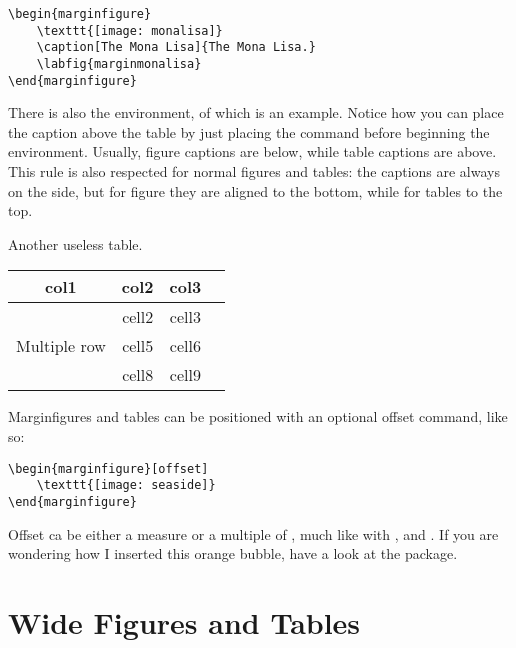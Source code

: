 \begin{lstlisting}[caption={Another caption.}]
\begin{marginfigure}
    \texttt{[image: monalisa]}
    \caption[The Mona Lisa]{The Mona Lisa.}
    \labfig{marginmonalisa}
\end{marginfigure}
\end{lstlisting}

There is also the  environment, of which 
 is an example. Notice how you can place the 
caption above the table by just placing the  command 
before beginning the  environment. Usually, figure 
captions are below, while table captions are above. This rule is also 
respected for normal figures and tables: the captions are always on the 
side, but for figure they are aligned to the bottom, while for tables to 
the top.

\begin{margintable}
\caption[Another useless table]{Another useless table.}
\raggedright
\begin{tabular}{cccc}
    \hline
    col1 & col2 & col3 \\
    \hline
    \multirow{3}{4em}{Multiple row} & cell2 & cell3 \\ & cell5 & cell6 
    \\ & cell8 & cell9 \\ \hline
\end{tabular}
\end{margintable}

Marginfigures and tables can be positioned with an optional offset 
command, like so:

\begin{lstlisting}
\begin{marginfigure}[offset]
    \texttt{[image: seaside]}
\end{marginfigure}
\end{lstlisting}

Offset ca be either a measure or a multiple of , 
much like with ,  and 
. If you are wondering how I 
inserted this orange bubble, have a look at the  package.

\section{Wide Figures and Tables}

